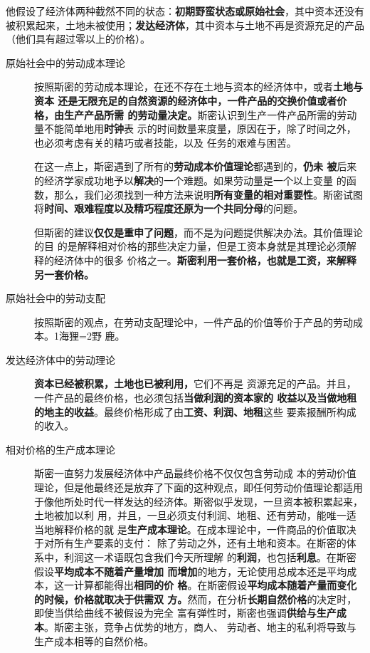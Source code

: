 他假设了经济体两种截然不同的状态：\textbf{初期野蛮状态或原始社会}，其中资本还没有
被积累起来，土地未被使用；\textbf{发达经济体}，其中资本与土地不再是资源充足的产品
（他们具有超过零以上的价格）。

\begin{description}
\item[原始社会中的劳动成本理论]

  按照斯密的劳动成本理论，在还不存在土地与资本的经济体中，或者\textbf{土地与资本
    还是无限充足的自然资源的经济体中，一件产品的交换价值或者价格，由生产产品所需
    的劳动量决定。}斯密认识到生产一件产品所需的劳动量不能简单地用\textbf{时钟}表
  示的时间数量来度量，原因在于，除了时间之外，也必须考虑有关的精巧或者技能，以及
  任务的艰难与困苦。

  在这一点上，斯密遇到了所有的\textbf{劳动成本价值理论}都遇到的，\textbf{仍未
    被}后来的经济学家成功地予以\textbf{解决}的一个难题。如果劳动量是一个以上变量
  的函数，那么，我们必须找到一种方法来说明\textbf{所有变量的相对重要性}。斯密试图
  将\textbf{时间、艰难程度以及精巧程度还原为一个共同分母}的问题。

  但斯密的建议\textbf{仅仅是重申了问题}，而不是为问题提供解决办法。其价值理论的目
  的是解释相对价格的那些决定力量，但是工资本身就是其理论必须解释的经济体中的很多
  价格之一。\textbf{斯密利用一套价格，也就是工资，来解释另一套价格。}

\item[原始社会中的劳动支配]
按照斯密的观点，在劳动支配理论中，一件产品的价值等价于产品的劳动成本。1海狸=2野
鹿。

\item[发达经济体中的劳动理论] \textbf{资本已经被积累，土地也已被利用，}它们不再是
  资源充足的产品。并且，一件产品的最终价格，也必须包括\textbf{当做利润的资本家的
    收益以及当做地租的地主的收益}。最终价格形成了由\textbf{工资、利润、地租}这些
  要素报酬所构成的收入。

\item[相对价格的生产成本理论]斯密一直努力发展经济体中产品最终价格不仅仅包含劳动成
  本的劳动价值理论，但是他最终还是放弃了下面的这种观点，即任何劳动价值理论都适用
  于像他所处时代一样发达的经济体。斯密似乎发现，一旦资本被积累起来，土地被加以利
  用，并且，一旦必须支付利润、地租、还有劳动，能唯一适当地解释价格的就
  是\textbf{生产成本理论}。在成本理论中，一件商品的价值取决于对所有生产要素的支付：
  除了劳动之外，还有土地和资本。在斯密的体系中，利润这一术语既包含我们今天所理解
  的\textbf{利润}，也包括\textbf{利息}。在斯密假设\textbf{平均成本不随着产量增加
    而增加}的地方，无论使用总成本还是平均成本，这一计算都能得出\textbf{相同的价
    格}。在斯密假设\textbf{平均成本随着产量而变化的时候，价格就取决于供需双
    方。}然而，在分析\textbf{长期自然价格}的决定时，即使当供给曲线不被假设为完全
  富有弹性时，斯密也强调\textbf{供给与生产成本}。斯密主张，竞争占优势的地方，商人、
  劳动者、地主的私利将导致与生产成本相等的自然价格。
\end{description}

